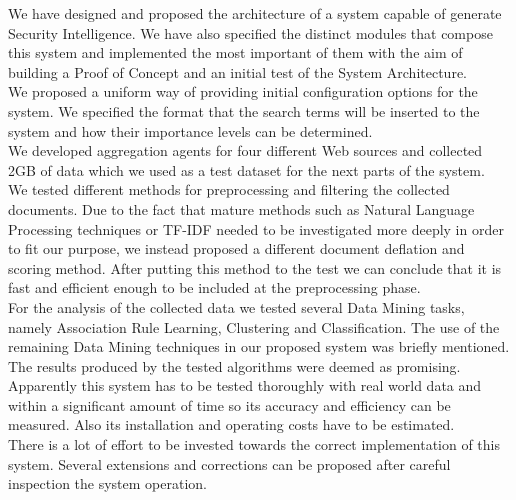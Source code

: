 \documentclass[12pt]{article}
\begin{document}
We have designed and proposed the architecture of a system capable of generate Security Intelligence. We have also specified the distinct modules that compose this system and implemented the most important of them with the aim of building a Proof of Concept and an initial test of the System Architecture. 
\hfill \break\\
We proposed a uniform way of providing initial configuration options for the system. We specified the format that the search terms will be inserted to the system and how their importance levels can be determined. 
\hfill \break\\
We developed aggregation agents for four different Web sources and collected 2GB of data which we used as a test dataset for the next parts of the system. 
\hfill \break\\
We tested different methods for preprocessing and filtering the collected documents. Due to the fact that mature methods such as Natural Language Processing techniques or TF-IDF needed to be investigated more deeply in order to fit our purpose, we instead proposed a different document deflation and scoring method. After putting this method to the test we can conclude that it is fast and efficient enough to be included at the preprocessing phase. 
\hfill \break\\
For the analysis of the collected data we tested several Data Mining tasks, namely Association Rule Learning, Clustering and Classification. The use of the remaining Data Mining techniques in our proposed system was briefly mentioned. The results produced by the tested algorithms were deemed as promising. 
\hfill \break\\
Apparently this system has to be tested thoroughly with real world data and within a significant amount of time so its accuracy and efficiency can be measured. Also its installation and operating costs have to be estimated. 
\hfill \break\\
There is a lot of effort to be invested towards the correct implementation of this system. Several extensions and corrections can be proposed after careful inspection the system operation. 


\newpage
\end{document}

